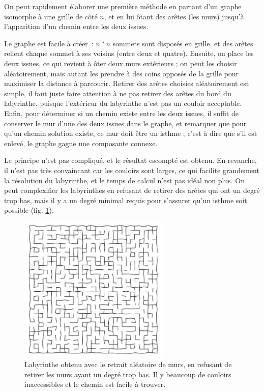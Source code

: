 \documentclass[a4paper, 10pt]{article}
\begin{document}
On peut rapidement élaborer une première méthode en partant d'un
graphe isomorphe à une grille de côté $n$, et en lui ôtant des arêtes
(les murs) jusqu'à l'apparition d'un chemin entre les deux issues.

Le graphe est facile à créer~: $n * n$ sommets sont disposés en
grille, et des arêtes relient chaque sommet à ses voisins (entre deux
et quatre). Ensuite, on place les deux issues, ce qui revient à ôter
deux murs extérieurs ; on peut les choisir aléatoirement, mais autant
les prendre à des coins opposés de la grille pour maximiser la
distance à parcourir. Retirer des arêtes choisies aléatoirement est
simple, il faut juste faire attention à ne pas retirer des arêtes du
bord du labyrinthe, puisque l'extérieur du labyrinthe n'est pas un
couloir acceptable. Enfin, pour déterminer si un chemin existe entre
les deux issues, il suffit de conserver le mur d'une des deux issues
dans le graphe, et remarquer que pour qu'un chemin solution existe, ce
mur doit être un isthme ; c'est à dire que s'il est enlevé, le graphe
gagne une composante connexe.

Le principe n'est pas compliqué, et le résultat escompté est
obtenu. En revanche, il n'est pas très convaincant car les couloirs
sont larges, ce qui facilite grandement la résolution du labyrinthe,
et le temps de calcul n'est pas idéal non plus. On peut complexifier
les labyrinthes en refusant de retirer des arêtes qui ont un degré
trop bas, mais il y a un degré minimal requis pour s'assurer qu'un
isthme soit possible (fig. \ref{fig:laby-isthm}).

\begin{figure}[hbt]
  \centering
  \includegraphics[height=7cm]{laby-isthm.png}
  \caption{Labyrinthe obtenu avec le retrait aléatoire de murs, en
    refusant de retirer les murs ayant un degré trop bas. Il y
    beaucoup de couloirs inaccessibles et le chemin est facile à
    trouver.}
  \label{fig:laby-isthm}
\end{figure}
\end{document}
